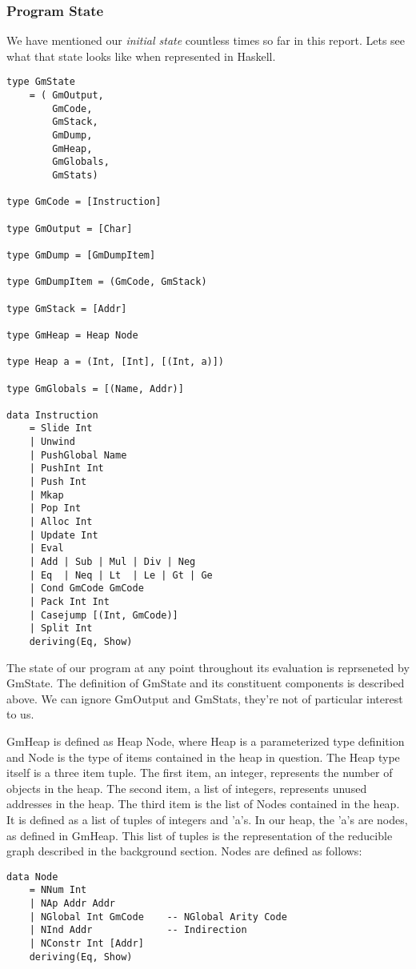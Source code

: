\subsubsection{Program State}
We have mentioned our \emph{initial state} countless times
so far in this report. Lets see what that state looks like
when represented in Haskell.

\begin{verbatim}
type GmState 
	= (	GmOutput,
		GmCode,
		GmStack,
		GmDump,
		GmHeap,
		GmGlobals,
		GmStats)

type GmCode = [Instruction]

type GmOutput = [Char]

type GmDump = [GmDumpItem]

type GmDumpItem = (GmCode, GmStack)		

type GmStack = [Addr]

type GmHeap = Heap Node

type Heap a = (Int, [Int], [(Int, a)])

type GmGlobals = [(Name, Addr)]

data Instruction 
	= Slide Int 
	| Unwind
	| PushGlobal Name 
	| PushInt Int 
	| Push Int 
	| Mkap
	| Pop Int
	| Alloc Int 
	| Update Int
	| Eval
	| Add | Sub | Mul | Div | Neg
	| Eq  | Neq | Lt  | Le | Gt | Ge
	| Cond GmCode GmCode
	| Pack Int Int
	| Casejump [(Int, GmCode)]
	| Split Int
	deriving(Eq, Show)
\end{verbatim}

The state of our program at any point throughout its evaluation
is reprseneted by GmState. The definition of GmState and its
constituent components is described above. We can ignore GmOutput
and GmStats, they're not of particular interest to us. 

GmHeap is defined as Heap Node, where Heap is a parameterized type
definition and Node is the type of items contained in the heap in 
question. The Heap type itself is a three item tuple. The first item, 
an integer, represents the number of objects in the heap. The second
item, a list of integers, represents unused addresses in the heap. 
The third item is the list of Nodes contained in the heap. It is 
defined as a list of tuples of integers and 'a's. In our heap, the
'a's are nodes, as defined in GmHeap. This list of tuples is the
representation of the reducible graph described in the background
section. Nodes are defined as follows:

\begin{verbatim}
data Node 
	= NNum Int 
	| NAp Addr Addr  		
	| NGlobal Int GmCode 	-- NGlobal Arity Code
	| NInd Addr 			-- Indirection
	| NConstr Int [Addr]
	deriving(Eq, Show)
\end{verbatim}

